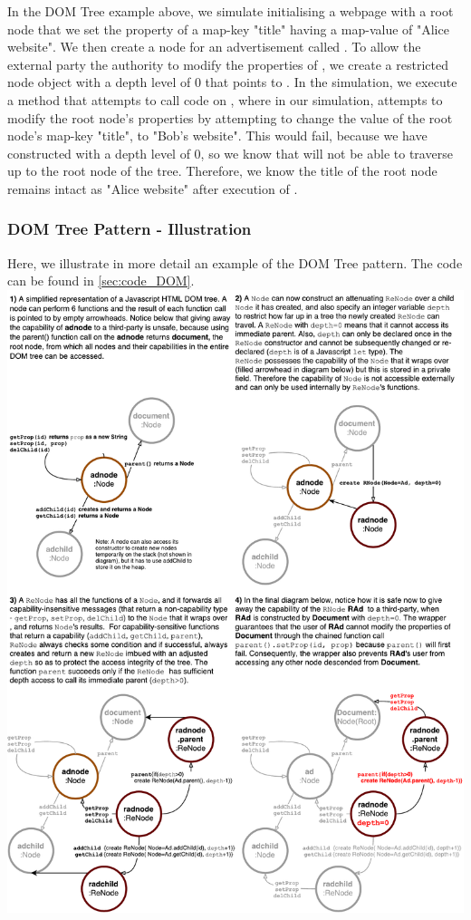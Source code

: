 \documentclass[a4paper,11pt,twoside]{article}
\begin{document}
In the DOM Tree example above, we simulate initialising a webpage with a root  node that we set the property of a map-key "title" having a map-value of "Alice website". We then create a node for an advertisement called . To allow the external party the authority to modify the properties of , we create a restricted node object  with a depth level of 0 that points to . In the simulation, we execute a method  that attempts to call code on , where in our simulation,  attempts to modify the root  node's properties by attempting to change the value of the root node's map-key "title", to "Bob's website". This would fail, because we have constructed  with a depth level of 0, so we know that  will not be able to traverse up to the root node of the tree. Therefore, we know the title of the root node remains intact as "Alice website" after execution of .
\begin{minipage}{\textwidth}
\subsubsection{DOM Tree Pattern - Illustration}\label{sec:figdom}
\small Here, we illustrate in more detail an example of the DOM Tree pattern. The code can be found in \cref{sec:code_DOM}.\\
\includegraphics[width=\textwidth]{figures/DOM.pdf}
 \label{fig:figdom}
\end{minipage}
\clearpage
\end{document}
